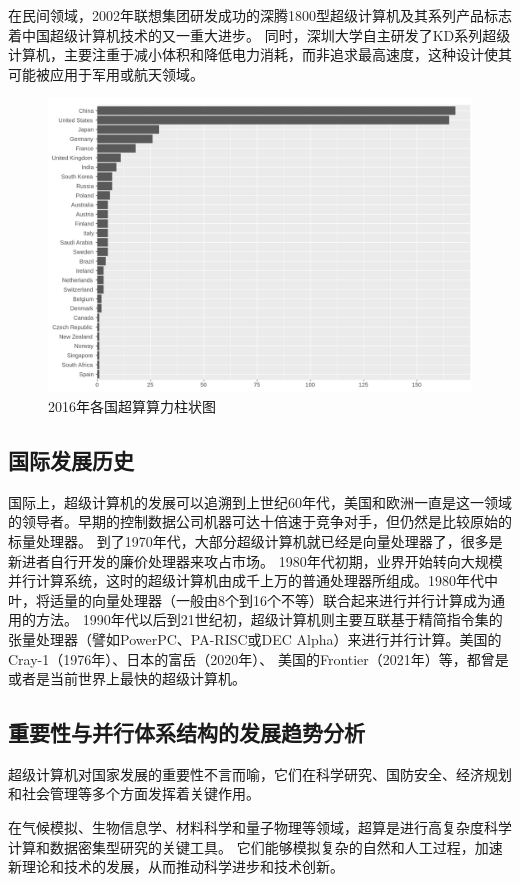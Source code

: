 \documentclass{ctexart}
\begin{document}
在民间领域，2002年联想集团研发成功的深腾1800型超级计算机及其系列产品标志着中国超级计算机技术的又一重大进步。
同时，深圳大学自主研发了KD系列超级计算机，主要注重于减小体积和降低电力消耗，而非追求最高速度，这种设计使其可能被应用于军用或航天领域。
\begin{figure}[h]
    \centering
    \includegraphics[width=\linewidth]{top500_supercomputers_by_country.png}
    \caption{2016年各国超算算力柱状图}
\end{figure}
\subsection{国际发展历史}
国际上，超级计算机的发展可以追溯到上世纪60年代，美国和欧洲一直是这一领域的领导者。早期的控制数据公司机器可达十倍速于竞争对手，但仍然是比较原始的标量处理器。
到了1970年代，大部分超级计算机就已经是向量处理器了，很多是新进者自行开发的廉价处理器来攻占市场。
1980年代初期，业界开始转向大规模并行计算系统，这时的超级计算机由成千上万的普通处理器所组成。1980年代中叶，将适量的向量处理器（一般由8个到16个不等）联合起来进行并行计算成为通用的方法。
1990年代以后到21世纪初，超级计算机则主要互联基于精简指令集的张量处理器（譬如PowerPC、PA-RISC或DEC Alpha）来进行并行计算。美国的Cray-1（1976年）、日本的富岳（2020年）、
美国的Frontier（2021年）等，都曾是或者是当前世界上最快的超级计算机。
\subsection{重要性与并行体系结构的发展趋势分析}
超级计算机对国家发展的重要性不言而喻，它们在科学研究、国防安全、经济规划和社会管理等多个方面发挥着关键作用。

在气候模拟、生物信息学、材料科学和量子物理等领域，超算是进行高复杂度科学计算和数据密集型研究的关键工具。
它们能够模拟复杂的自然和人工过程，加速新理论和技术的发展，从而推动科学进步和技术创新。
\end{document}
